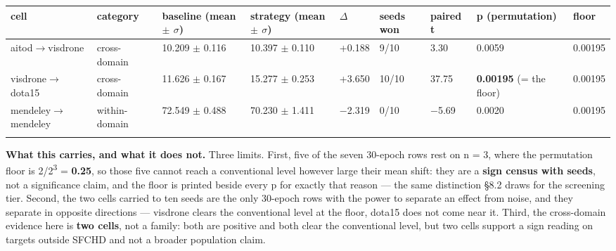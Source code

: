 \documentclass[pdflatex,sn-mathphys-ay]{sn-jnl}
\begin{document}
{\footnotesize
\setlength{\tabcolsep}{4pt}
\begin{longtable}{p{}p{}p{}p{}p{}p{}p{}p{}p{}}
\toprule
cell & category & baseline (mean \ensuremath{\pm} \ensuremath{\sigma}) & strategy (mean \ensuremath{\pm} \ensuremath{\sigma}) & \ensuremath{\Delta} & seeds won & paired t & p (permutation) & floor \\
\midrule
\endhead
aitod\ensuremath{\rightarrow}visdrone & cross-domain & 10.209 \ensuremath{\pm} 0.116 & 10.397 \ensuremath{\pm} 0.110 & +0.188 & 9/10 & 3.30 & 0.0059 & 0.00195 \\
visdrone\ensuremath{\rightarrow}dota15 & cross-domain & 11.626 \ensuremath{\pm} 0.167 & 15.277 \ensuremath{\pm} 0.253 & +3.650 & 10/10 & 37.75 & \textbf{0.00195} (= the floor) & 0.00195 \\
mendeley\ensuremath{\rightarrow}mendeley & within-domain & 72.549 \ensuremath{\pm} 0.488 & 70.230 \ensuremath{\pm} 1.411 & \ensuremath{-}2.319 & 0/10 & \ensuremath{-}5.69 & 0.0020 & 0.00195 \\
\botrule
\end{longtable}}

\textbf{What this carries, and what it does not.} Three limits. First, five of the seven 30-epoch rows rest on n = 3, where the permutation floor is 2/2\textsuperscript{3} = \textbf{0.25}, so those five cannot reach a conventional level however large their mean shift: they are a \textbf{sign census with seeds}, not a significance claim, and the floor is printed beside every p for exactly that reason --- the same distinction \S{}8.2 draws for the screening tier. Second, the two cells carried to ten seeds are the only 30-epoch rows with the power to separate an effect from noise, and they separate in opposite directions --- visdrone clears the conventional level at the floor, dota15 does not come near it. Third, the cross-domain evidence here is \textbf{two cells}, not a family: both are positive and both clear the conventional level, but two cells support a sign reading on targets outside SFCHD and not a broader population claim.
\end{document}
